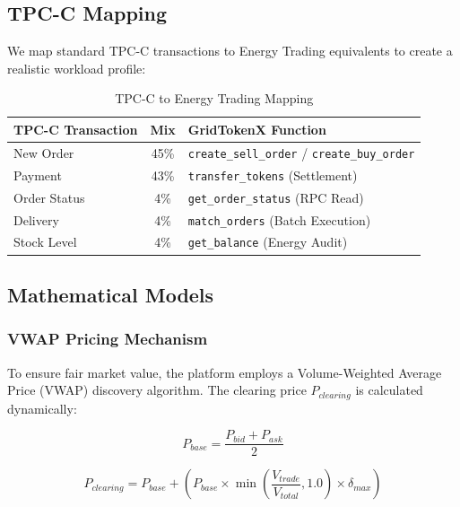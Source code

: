 \documentclass[conference]{IEEEtran}
\begin{document}
\subsection{TPC-C Mapping}
We map standard TPC-C transactions \cite{b1} to Energy Trading equivalents to create a realistic workload profile:

\begin{table}[htbp]
\caption{TPC-C to Energy Trading Mapping}
\begin{center}
\begin{tabular}{lcp{4.5cm}}
\toprule
\textbf{TPC-C Transaction} & \textbf{Mix} & \textbf{GridTokenX Function} \\
\midrule
New Order & 45\% & \texttt{create\_sell\_order} / \texttt{create\_buy\_order} \\
Payment & 43\% & \texttt{transfer\_tokens} (Settlement) \\
Order Status & 4\% & \texttt{get\_order\_status} (RPC Read) \\
Delivery & 4\% & \texttt{match\_orders} (Batch Execution) \\
Stock Level & 4\% & \texttt{get\_balance} (Energy Audit) \\
\bottomrule
\end{tabular}
\label{tab:tpcc-mapping}
\end{center}
\end{table}

\subsection{Mathematical Models}

\subsubsection{VWAP Pricing Mechanism}
To ensure fair market value, the platform employs a Volume-Weighted Average Price (VWAP) discovery algorithm. The clearing price $P_{clearing}$ is calculated dynamically:

\begin{equation}
P_{base} = \frac{P_{bid} + P_{ask}}{2}
\label{eq:pbase}
\end{equation}

\begin{equation}
P_{clearing} = P_{base} + \left( P_{base} \times \min\left(\frac{V_{trade}}{V_{total}}, 1.0\right) \times \delta_{max} \right)
\label{eq:pclearing}
\end{equation}
\end{document}
